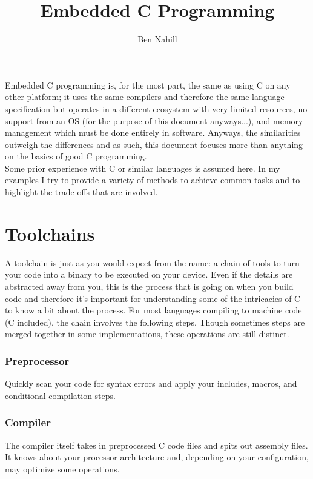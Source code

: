 \documentclass[10pt]{article}
\title{Embedded C Programming}
\author{Ben Nahill}
\begin{document}
\maketitle
\tableofcontents
\thispagestyle{empty}
\clearpage
{}

Embedded C programming is, for the most part, the same as using C on any other platform; it uses the same compilers and therefore the same language specification but operates in a different ecosystem with very limited resources, no support from an OS (for the purpose of this document anyways...), and memory management which must be done entirely in software. Anyways, the similarities outweigh the differences and as such, this document focuses more than anything on the basics of good C programming. \\

Some prior experience with C or similar languages is assumed here. In my examples I try to provide a variety of methods to achieve common tasks and to highlight the trade-offs that are involved.

\section{Toolchains}
A toolchain is just as you would expect from the name: a chain of tools to turn your code into a binary to be executed on your device. Even if the details are abstracted away from you, this is the process that is going on when you build code and therefore it's important for understanding some of the intricacies of C to know a bit about the process. For most languages compiling to machine code (C included), the chain involves the following steps. Though sometimes steps are merged together in some implementations, these operations are still distinct.

\subsubsection*{Preprocessor}
Quickly scan your code for syntax errors and apply your includes, macros, and conditional compilation steps. 

\subsubsection*{Compiler}

The compiler itself takes in preprocessed C code files and spits out assembly files. It knows about your processor architecture and, depending on your configuration, may optimize some operations. \\
\end{document}
